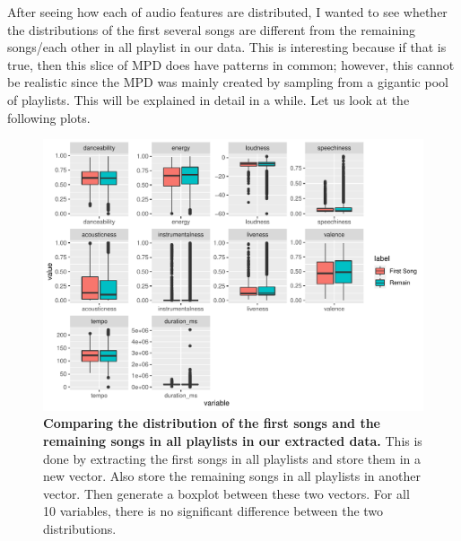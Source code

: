 \documentclass[12pt]{article}
\theoremstyle{plain}
\theoremstyle{definition}
\theoremstyle{remark}
\begin{document}
After seeing how each of audio features are distributed, I wanted to see whether the distributions of the first several songs are different from the remaining songs/each other in all playlist in our data. This is interesting because if that is true, then this slice of MPD does have patterns in common; however, this cannot be realistic since the MPD was mainly created by sampling from a gigantic pool of playlists. This will be explained in detail in a while. Let us look at the following plots.

\begin{figure}[htp]
    \centering
    \includegraphics[width=\textwidth]{Images/1st.pdf}
    \caption{\textbf{Comparing the distribution of the first songs and the remaining songs in all playlists in our extracted data.} This is done by extracting the first songs in all playlists and store them in a new vector. Also store the remaining songs in all playlists in another vector. Then generate a boxplot between these two vectors. For all 10 variables, there is no significant difference between the two distributions.}
    \label{fig:1st}
\end{figure}
\end{document}
